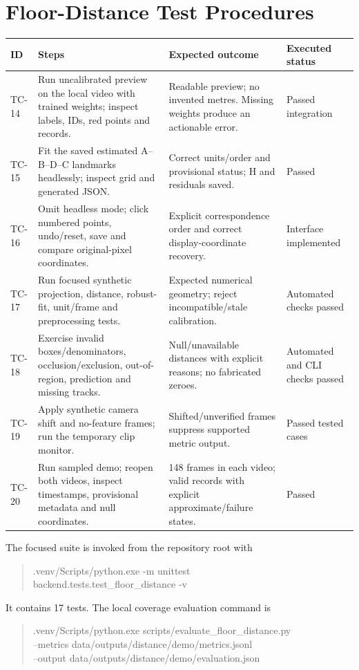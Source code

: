 \section{Floor-Distance Test Procedures}
\begin{longtable}{P{0.09\textwidth}P{0.35\textwidth}P{0.30\textwidth}P{0.14\textwidth}}
\toprule
ID & Steps & Expected outcome & Executed status\\
\midrule
\endhead
TC-14 & Run uncalibrated preview on the local video with trained weights; inspect labels, IDs, red points and records. & Readable preview; no invented metres. Missing weights produce an actionable error. & Passed integration\\
TC-15 & Fit the saved estimated A--B--D--C landmarks headlessly; inspect grid and generated JSON. & Correct units/order and provisional status; H and residuals saved. & Passed\\
TC-16 & Omit headless mode; click numbered points, undo/reset, save and compare original-pixel coordinates. & Explicit correspondence order and correct display-coordinate recovery. & Interface implemented\\
TC-17 & Run focused synthetic projection, distance, robust-fit, unit/frame and preprocessing tests. & Expected numerical geometry; reject incompatible/stale calibration. & Automated checks passed\\
TC-18 & Exercise invalid boxes/denominators, occlusion/exclusion, out-of-region, prediction and missing tracks. & Null/unavailable distances with explicit reasons; no fabricated zeroes. & Automated and CLI checks passed\\
TC-19 & Apply synthetic camera shift and no-feature frames; run the temporary clip monitor. & Shifted/unverified frames suppress supported metric output. & Passed tested cases\\
TC-20 & Run sampled demo; reopen both videos, inspect timestamps, provisional metadata and null coordinates. & 148 frames in each video; valid records with explicit approximate/failure states. & Passed\\
\bottomrule
\end{longtable}
The focused suite is invoked from the repository root with
\begin{quote}\small\ttfamily
.venv/Scripts/python.exe -m unittest\\
\hspace*{1em}backend.tests.test\_floor\_distance -v
\end{quote}
It contains 17 tests. The local coverage evaluation command is
\begin{quote}\small\ttfamily
.venv/Scripts/python.exe scripts/evaluate\_floor\_distance.py\\
\hspace*{1em}--metrics data/outputs/distance/demo/metrics.jsonl\\
\hspace*{1em}--output data/outputs/distance/demo/evaluation.json
\end{quote}

